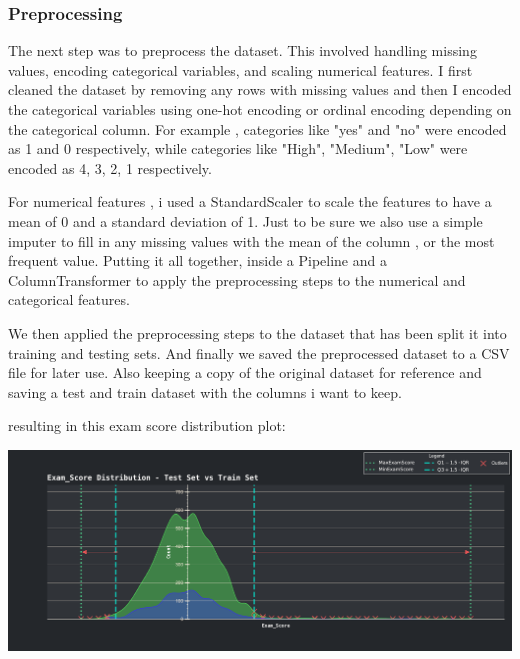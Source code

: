 \documentclass{assignment}
\begin{document}
\subsubsection{Preprocessing}
The next step was to preprocess the dataset. This involved handling missing values, encoding categorical variables, and scaling numerical features.
I first cleaned the dataset by removing any rows with missing values and then I encoded the categorical variables using one-hot encoding or ordinal encoding depending on the categorical column.
For example , categories like "yes" and "no" were encoded as 1 and 0 respectively, while categories like "High", "Medium", "Low" were encoded as 4, 3, 2, 1 respectively.

For numerical features , i used a StandardScaler to scale the features to have a mean of 0 and a standard deviation of 1.
Just to be sure we also use a simple imputer to fill in any missing values with the mean of the column , or the most frequent value.
Putting it all together, inside a Pipeline and a ColumnTransformer to apply the preprocessing steps to the numerical and categorical features.

We then applied the preprocessing steps to the dataset that has been split it into training and testing sets.
And finally we saved the preprocessed dataset to a CSV file for later use.
Also keeping a copy of the original dataset for reference and saving a test and train dataset with the columns i want to keep.


resulting in this exam score distribution plot:
\begin{center}
    \includegraphics[width=6.5in]{../report/assets/Exam_Score_Distribution_test_vs_train_with_outliers.pdf}
\end{center}
\end{document}
